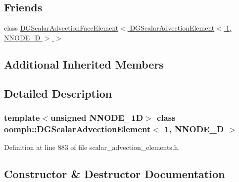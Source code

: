 \subsection*{Friends}
\begin{DoxyCompactItemize}
\item 
class \hyperlink{classoomph_1_1DGScalarAdvectionElement_3_011_00_01NNODE__1D_01_4_ab7071d90b186653adba9bda99f444804}{D\+G\+Scalar\+Advection\+Face\+Element$<$ D\+G\+Scalar\+Advection\+Element$<$ 1, N\+N\+O\+D\+E\+\_\+D $>$ $>$}
\end{DoxyCompactItemize}
\subsection*{Additional Inherited Members}


\subsection{Detailed Description}
\subsubsection*{template$<$unsigned N\+N\+O\+D\+E\+\_\+1D$>$\newline
class oomph\+::\+D\+G\+Scalar\+Advection\+Element$<$ 1, N\+N\+O\+D\+E\+\_\+D $>$}



Definition at line 883 of file scalar\+\_\+advection\+\_\+elements.\+h.



\subsection{Constructor \& Destructor Documentation}
\mbox{\label{classoomph_1_1DGScalarAdvectionElement_3_011_00_01NNODE__1D_01_4_a96a7d8286a6afcb5b01f61b2f7ec3e34}} 
